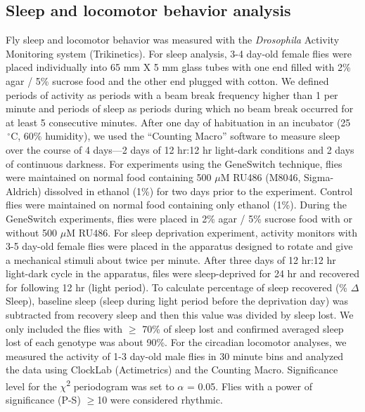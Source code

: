 \subsection*{Sleep and locomotor behavior analysis}

Fly sleep and locomotor behavior was measured with the \emph{Drosophila} Activity Monitoring system (Trikinetics).
For sleep analysis, 3-4 day-old female flies were placed individually into 65 mm X 5 mm glass tubes with one end filled with 2\% agar / 5\% sucrose food and the other end plugged with cotton.
We defined periods of activity as periods with a beam break frequency higher than 1 per minute and periods of sleep as periods during which no beam break occurred for at least 5 consecutive minutes\cite{Shaw:2000ui}.
After one day of habituation in an incubator (25$\,^{\circ}\mathrm{C}$, 60\% humidity), we used the ``Counting Macro'' software\cite{pfeiffenberger:2010ab} to measure sleep over the course of 4 days---2 days of 12 hr:12 hr light-dark conditions and 2 days of continuous darkness.
For experiments using the GeneSwitch technique, flies were maintained on normal food containing 500 $\mu$M RU486 (M8046, Sigma-Aldrich) dissolved in ethanol (1\%) for two days prior to the experiment.
Control flies were maintained on normal food containing only ethanol (1\%).
During the GeneSwitch experiments, flies were placed in 2\% agar / 5\% sucrose food with or without 500 $\mu$M RU486.
For sleep deprivation experiment, activity monitors with 3-5 day-old female flies were placed in the apparatus designed to rotate and give a mechanical stimuli about twice per minute.
After three days of 12 hr:12 hr light-dark cycle in the apparatus, files were sleep-deprived for 24 hr and recovered for following 12 hr (light period). To calculate percentage of sleep recovered (\% $\Delta$Sleep), baseline sleep (sleep during light period before the deprivation day) was subtracted from recovery sleep and then this value was divided by sleep lost.
We only included the flies with $\geq$ 70\% of sleep lost and confirmed averaged sleep lost of each genotype was about 90\%.
For the circadian locomotor analyses, we measured the activity of 1-3 day-old male flies in 30 minute bins and analyzed the data using ClockLab (Actimetrics) and the Counting Macro\cite{pfeiffenberger:2010aa}. Significance level for the $\chi$\textsuperscript{2} periodogram was set to $\alpha$ = 0.05.
Flies with a power of significance (P-S) $\geq$10 were considered rhythmic.

  